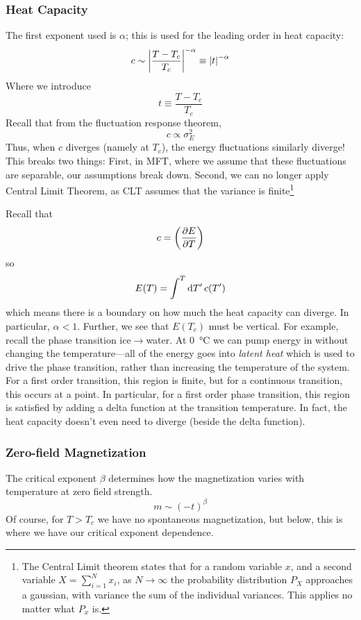 \subsubsection{Heat Capacity}
The first exponent used is \(\alpha\); this is used for the leading order in heat capacity:
\begin{equation}
	c\sim \left|\frac{T-T_c}{T_c}\right|^{-\alpha}\equiv \left|t\right|^{-\alpha}
\end{equation}
Where we introduce
\begin{equation}
	t\equiv\frac{T-T_c}{T_c}
\end{equation}
Recall that from the fluctuation response theorem,
\[c\propto\sigma_E^2\]
Thus, when \(c\) diverges (namely at \(T_c\)), the energy fluctuations similarly diverge! This breaks two things: First, in MFT, where we assume that these fluctuations are separable, our assumptions break down. Second, we can no longer apply Central Limit Theorem, as CLT assumes that the variance is finite\footnote{The Central Limit theorem states that for a random variable \(x\), and a second variable \(X = \sum_{i=1}^N x_i\), as \(N\to\infty\) the probability distribution \(P_X\) approaches a gaussian, with variance the sum of the individual variances. This applies no matter what \(P_x\) is.} 

Recall that 
\[c = \left(\frac{\partial E}{\partial T}\right)\]
so
\[E(T) = \int^T\d{T'}c(T')\]
which means there is a boundary on how much the heat capacity can diverge. In particular, \(\alpha<1\). Further, we see that \(E(T_c)\) must be vertical. For example, recall the phase transition ice\(\to\)water. At \SI{0}{\celsius} we can pump energy in without changing the temperature---all of the energy goes into \emph{latent heat} which is used to drive the phase transition, rather than increasing the temperature of the system. For a first order transition, this region is finite, but for a continuous transition, this occurs at a point. In particular, for a first order phase transition, this region is satisfied by adding a delta function at the transition temperature. In fact, the heat capacity doesn't even need to diverge (beside the delta function).

\subsubsection{Zero-field Magnetization}
The critical exponent \(\beta\) determines how the magnetization varies with temperature at zero field strength.
\begin{equation}
	m\sim(-t)^\beta
\end{equation}
Of course, for \(T>T_c\) we have no spontaneous magnetization, but below, this is where we have our critical exponent dependence.


